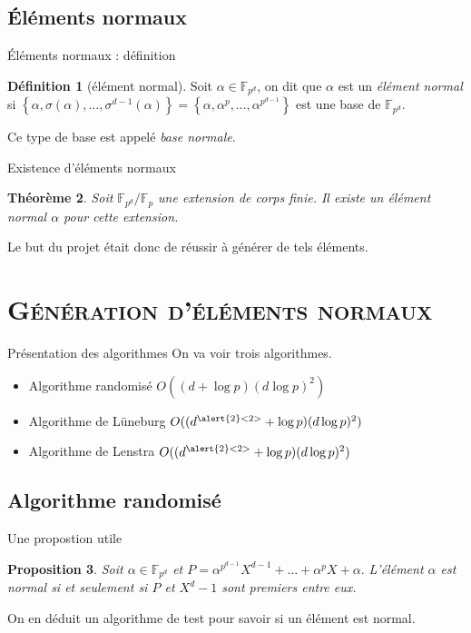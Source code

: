 \documentclass[xcolor=x11names,compress]{beamer}
\theoremstyle{break}
\newtheorem{thm}{Théorème}[section]
\newtheorem{prop}[thm]{Proposition}
\theoremstyle{sc}
\theoremstyle{definition}
\newtheorem{defi}[thm]{Définition}
\theoremstyle{remark}
\begin{document}
\subsection{Éléments normaux}
\begin{frame}{Éléments normaux : définition}
  \begin{defi}[élément normal]
    Soit $\alpha\in\mathbb{F}_{p^d}$, on dit que $\alpha$ est un \emph{élément
    normal} si $\left\{ \alpha, \sigma(\alpha), \dots, \sigma^{d-1}(\alpha)
  \right\} = \left\{ \alpha, \alpha^p, \dots, \alpha^{p^{d-1}} \right\}$ est une
  base de $\mathbb{F}_{p^d}$.
  \end{defi}
  Ce type de base est appelé \emph{base normale}.
\end{frame}

\begin{frame}{Existence d'éléments normaux}
  \begin{thm}
    Soit $\mathbb{F}_{p^d}/\mathbb{F}_p$ une extension de corps finie. Il existe
    un élément normal $\alpha$ pour cette extension.
  \end{thm}
  Le but du projet était donc de réussir à générer de tels éléments.
\end{frame}

\section{\scshape Génération d'éléments normaux}
\begin{frame}{Présentation des algorithmes}
  On va voir trois algorithmes.

  \begin{itemize}
    \item Algorithme randomisé $O((d+\log p)(d\log p)^2)$
    \item Algorithme de Lüneburg $O((d^{\alert{2}<2>}+\log p)(d\log p)^2)$
    \item Algorithme de Lenstra $O((d^{\alert{2}<2>}+\log p)(d\log p)^2)$
  \end{itemize}

\end{frame}

\subsection{Algorithme randomisé}
\begin{frame}{Une propostion utile}
  \begin{prop}
    Soit $\alpha\in\mathbb{F}_{p^d}$ et
    $P=\alpha^{p^{d-1}}X^{d-1}+\dots+\alpha^pX+\alpha.$
    L'élément $\alpha$ est normal si et seulement si $P$ et $X^d-1$ sont
    premiers entre eux.
  \end{prop}
  On en déduit un algorithme de test pour savoir si un élément est normal.
\end{frame}
\end{document}
